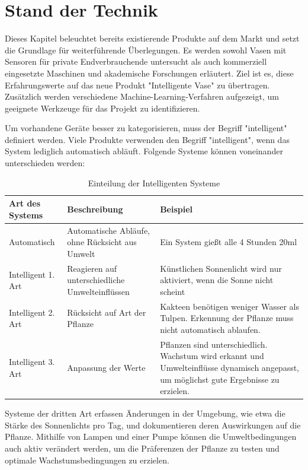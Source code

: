 \section{Stand der Technik}\label{sec_2}

Dieses Kapitel beleuchtet bereits existierende Produkte auf dem Markt und setzt die Grundlage für weiterführende Überlegungen. Es werden sowohl Vasen mit Sensoren für private Endverbrauchende untersucht als auch kommerziell eingesetzte Maschinen und akademische Forschungen erläutert. Ziel ist es, diese Erfahrungswerte auf das neue Produkt "Intelligente Vase" zu übertragen. Zusätzlich werden verschiedene Machine-Learning-Verfahren aufgezeigt, um geeignete Werkzeuge für das Projekt zu identifizieren.

Um vorhandene Geräte besser zu kategorisieren, muss der Begriff "intelligent" definiert werden. Viele Produkte verwenden den Begriff "intelligent", wenn das System lediglich automatisch abläuft. Folgende Systeme können voneinander unterschieden werden:


\begin{table}
    \centering
    \begin{tabular}{|p{3cm}|p{5cm}|p{5cm}|}
        Art des Systems & Beschreibung & Beispiel\\ \hline
        Automatisch & Automatische Abläufe, ohne Rücksicht aus Umwelt & Ein System gießt alle 4 Stunden 20ml\\ \hline
        Intelligent 1. Art & Reagieren auf unterschiedliche Umwelteinflüssen & Künstlichen Sonnenlicht wird nur aktiviert, wenn die Sonne nicht scheint\\ \hline
        Intelligent 2. Art & Rücksicht auf Art der Pflanze & Kakteen benötigen weniger Wasser als Tulpen. Erkennung der Pflanze muss nicht automatisch ablaufen.\\ \hline
        Intelligent 3. Art & Anpassung der Werte & Pflanzen sind unterschiedlich. Wachstum wird erkannt und Umwelteinflüsse dynamisch angepasst, um möglichst gute Ergebnisse zu erzielen.\\ \hline
    \end{tabular}
    \caption{Einteilung der Intelligenten Systeme}
    \label{tab:my_label}
\end{table}

Systeme der dritten Art erfassen Änderungen in der Umgebung, wie etwa die Stärke des Sonnenlichts pro Tag, und dokumentieren deren Auswirkungen auf die Pflanze. Mithilfe von Lampen und einer Pumpe können die Umweltbedingungen auch aktiv verändert werden, um die Präferenzen der Pflanze zu testen und optimale Wachstumsbedingungen zu erzielen.

